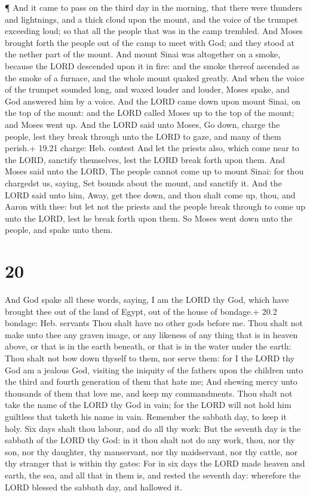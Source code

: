  ¶ And it came to pass on the third day in the morning,
that there were thunders and lightnings, and a thick cloud upon the
mount, and the voice of the trumpet exceeding loud; so that all the
people that was in the camp trembled.  And Moses brought
forth the people out of the camp to meet with God; and they stood at the
nether part of the mount.  And mount Sinai was altogether
on a smoke, because the LORD descended upon it in fire: and the smoke
thereof ascended as the smoke of a furnace, and the whole mount quaked
greatly.  And when the voice of the trumpet sounded long,
and waxed louder and louder, Moses spake, and God answered him by a
voice.  And the LORD came down upon mount Sinai, on the top
of the mount: and the LORD called Moses up to the top of the mount; and
Moses went up.  And the LORD said unto Moses, Go down,
charge the people, lest they break through unto the LORD to gaze, and
many of them perish.+ 19.21 charge: Heb. contest  And let
the priests also, which come near to the LORD, sanctify themselves, lest
the LORD break forth upon them.  And Moses said unto the
LORD, The people cannot come up to mount Sinai: for thou chargedst us,
saying, Set bounds about the mount, and sanctify it.  And
the LORD said unto him, Away, get thee down, and thou shalt come up,
thou, and Aaron with thee: but let not the priests and the people break
through to come up unto the LORD, lest he break forth upon them.
 So Moses went down unto the people, and spake unto them.

\hypertarget{section-19}{%
\section{20}\label{section-19}}

 And God spake all these words, saying,  I am
the LORD thy God, which have brought thee out of the land of Egypt, out
of the house of bondage.+ 20.2 bondage: Heb. servants  Thou
shalt have no other gods before me.  Thou shalt not make
unto thee any graven image, or any likeness of any thing that is in
heaven above, or that is in the earth beneath, or that is in the water
under the earth:  Thou shalt not bow down thyself to them,
nor serve them: for I the LORD thy God am a jealous God, visiting the
iniquity of the fathers upon the children unto the third and fourth
generation of them that hate me;  And shewing mercy unto
thousands of them that love me, and keep my commandments. 
Thou shalt not take the name of the LORD thy God in vain; for the LORD
will not hold him guiltless that taketh his name in vain. 
Remember the sabbath day, to keep it holy.  Six days shalt
thou labour, and do all thy work:  But the seventh day is
the sabbath of the LORD thy God: in it thou shalt not do any work, thou,
nor thy son, nor thy daughter, thy manservant, nor thy maidservant, nor
thy cattle, nor thy stranger that is within thy gates:  For
in six days the LORD made heaven and earth, the sea, and all that in
them is, and rested the seventh day: wherefore the LORD blessed the
sabbath day, and hallowed it.

